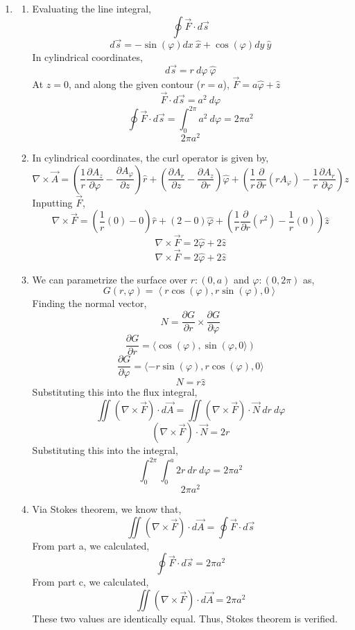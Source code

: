 \documentclass[12pt]{article}
\begin{document}
\begin{enumerate}
\begin{enumerate}
	\end{enumerate}

	\item [1.4]
	\begin{enumerate}
		\item [a.]
		Evaluating the line integral,
		\[\oint \vec F \cdot d\vec s\]
		\[d\vec s = -\sin(\varphi)dx\:\hat x + \cos(\varphi)dy\:\hat y\]
		In cylindrical coordinates,
		\[d\vec s = r \:d\varphi\:\hat \varphi\]
		At $z=0$, and along the given contour ($r=a$), $\vec F = a\hat \varphi + \hat z$
		\[\vec F \cdot d\vec s = a^2\:d\varphi\]
		\[\oint \vec F \cdot d\vec s = \int_0^{2\pi}a^2\:d\varphi=2\pi a^2\]
		\[\boxed{2\pi a^2}\]

		\item [b.]
		In cylindrical coordinates, the curl operator is given by,
		\[\nabla \times \vec A= \left(\frac{1}{r}\frac{\partial A_z}{\partial \varphi}-\frac{\partial A_\varphi}{\partial z}\right)\hat r+\left(\frac{\partial A_r}{\partial z}-\frac{\partial A_z}{\partial r}\right)\hat \varphi + \left(\frac{1}{r}\frac{\partial}{\partial r}(rA_\varphi)-\frac{1}{r}\frac{\partial A_r}{\partial \varphi}\right)\hat z\]
		Inputting $\vec F$,
		\[\nabla \times \vec F = \left(\frac{1}{r}(0)-0\right)\hat r + \left(2-0\right)\hat \varphi + \left(\frac{1}{r}\frac{\partial}{\partial r}(r^2)-\frac{1}{r}(0)\right)\hat z\]
		\[\nabla \times \vec F = 2\hat \varphi + 2\hat z\]
		\[\boxed{\nabla \times \vec F = 2\hat \varphi + 2 \hat z}\]

		\item [c.]
		We can parametrize the surface over $r:(0,a)$ and $\varphi:(0,2\pi)$ as,
		\[G(r,\varphi)=\left\langle r\cos(\varphi), r\sin(\varphi), 0\right\rangle\]
		Finding the normal vector,
		\[N=\frac{\partial G}{\partial r}\times \frac{\partial G}{\partial \varphi}\]
		\[\frac{\partial G}{\partial r}=\langle \cos(\varphi),\sin(\varphi, 0 \rangle)\]
		\[\frac{\partial G}{\partial \varphi}=\langle -r\sin(\varphi), r\cos(\varphi), 0\rangle\]
		\[N = r\hat z\]
		Substituting this into the flux integral,
		\[\iint (\nabla \times \vec F)\cdot d\vec A = \iint (\nabla \times \vec F) \cdot \vec N \: dr \: d\varphi\]
		\[(\nabla \times \vec F)\cdot \vec N = 2r\]
		Substituting this into the integral,
		\[\int_0^{2\pi}\int_0^a 2r \: dr \: d\varphi = 2\pi a^2\]
		\[\boxed{2\pi a^2}\]

		\item [d.]
		Via Stokes theorem, we know that,
		\[\iint(\nabla \times \vec F)\cdot d\vec A = \oint \vec F \cdot d\vec s\]
		From part a, we calculated,
		\[\oint \vec F \cdot d\vec s = 2\pi a^2\]
		From part c, we calculated,
		\[\iint (\nabla \times \vec F)\cdot d\vec A = 2\pi a^2\]
		These two values are identically equal.
		Thus, Stokes theorem is verified.


\end{enumerate}
\end{enumerate}
\end{document}
